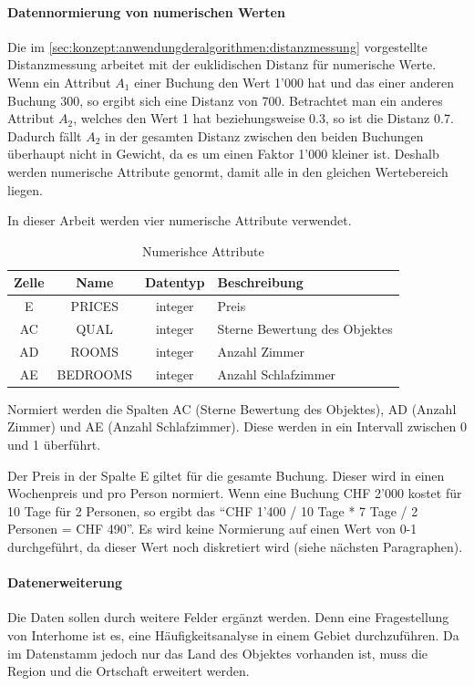 \paragraph{Datennormierung von numerischen Werten} Die im \cref{sec:konzept:anwendungderalgorithmen:distanzmessung} vorgestellte Distanzmessung arbeitet mit der euklidischen Distanz für numerische Werte. Wenn ein Attribut $A_1$ einer Buchung den Wert 1'000 hat und das einer anderen Buchung 300, so ergibt sich eine Distanz von 700. Betrachtet man ein anderes Attribut $A_2$, welches den Wert 1 hat beziehungsweise 0.3, so ist die Distanz 0.7. Dadurch fällt $A_2$ in der gesamten Distanz zwischen den beiden Buchungen überhaupt nicht in Gewicht, da es um einen Faktor 1'000 kleiner ist. Deshalb werden numerische Attribute genormt, damit alle in den gleichen Wertebereich liegen.

In dieser Arbeit werden vier numerische Attribute verwendet.
\begin{table}[H] 
	\caption{Numerishce Attribute}
	\centering
	\label{fig:recherche:datenvorbereitung:5}
	\begin{tabular}{ | c | c | c | l | } 
		\hline 
		\rowcolor{tableheadcolor}
		\bfseries Zelle & \bfseries Name & \bfseries Datentyp & \bfseries Beschreibung \\ \hline 
		E & PRICES & integer & Preis \\ \hline 
		AC & QUAL & integer & Sterne Bewertung des Objektes \\ \hline 
		AD & ROOMS & integer & Anzahl Zimmer \\ \hline 
		AE & BEDROOMS & integer & Anzahl Schlafzimmer \\ \hline 
	\end{tabular}
\end{table}

Normiert werden die Spalten AC (Sterne Bewertung des Objektes), AD (Anzahl Zimmer) und AE (Anzahl Schlafzimmer). Diese werden in ein Intervall zwischen 0 und 1 überführt.

Der Preis in der Spalte E giltet für die gesamte Buchung. Dieser wird in einen Wochenpreis und pro Person normiert. Wenn eine Buchung CHF 2'000 kostet für 10 Tage für 2 Personen, so ergibt das "`CHF 1'400 / 10 Tage * 7 Tage / 2 Personen = CHF 490"'. Es wird keine Normierung auf einen Wert von 0-1 durchgeführt, da dieser Wert noch diskretiert wird (siehe nächsten Paragraphen).

\paragraph{Datenerweiterung} Die Daten sollen durch weitere Felder ergänzt werden. Denn eine Fragestellung von Interhome ist es, eine Häufigkeitsanalyse in einem Gebiet durchzuführen. Da im Datenstamm jedoch nur das Land des Objektes vorhanden ist, muss die Region und die Ortschaft erweitert werden. 

